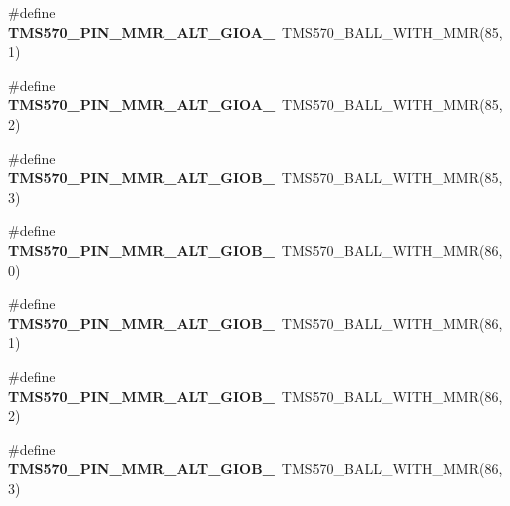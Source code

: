 \begin{DoxyCompactItemize}
\item 
\mbox{\label{tms570lc4357-pins_8h_ab5885cb13bfd1090faae8cbc427b3018}} 
\#define {\bfseries T\+M\+S570\+\_\+\+P\+I\+N\+\_\+\+M\+M\+R\+\_\+\+A\+L\+T\+\_\+\+G\+I\+O\+A\+\_}~T\+M\+S570\+\_\+\+B\+A\+L\+L\+\_\+\+W\+I\+T\+H\+\_\+\+M\+MR(85, 1)
\item 
\mbox{\label{tms570lc4357-pins_8h_a97676f009eaab31f20d536e79f113e09}} 
\#define {\bfseries T\+M\+S570\+\_\+\+P\+I\+N\+\_\+\+M\+M\+R\+\_\+\+A\+L\+T\+\_\+\+G\+I\+O\+A\+\_}~T\+M\+S570\+\_\+\+B\+A\+L\+L\+\_\+\+W\+I\+T\+H\+\_\+\+M\+MR(85, 2)
\item 
\mbox{\label{tms570lc4357-pins_8h_ab7b10a216d5ad71d419e45476c634d60}} 
\#define {\bfseries T\+M\+S570\+\_\+\+P\+I\+N\+\_\+\+M\+M\+R\+\_\+\+A\+L\+T\+\_\+\+G\+I\+O\+B\+\_}~T\+M\+S570\+\_\+\+B\+A\+L\+L\+\_\+\+W\+I\+T\+H\+\_\+\+M\+MR(85, 3)
\item 
\mbox{\label{tms570lc4357-pins_8h_a47709416080973f8d8bc85a51ff895ce}} 
\#define {\bfseries T\+M\+S570\+\_\+\+P\+I\+N\+\_\+\+M\+M\+R\+\_\+\+A\+L\+T\+\_\+\+G\+I\+O\+B\+\_}~T\+M\+S570\+\_\+\+B\+A\+L\+L\+\_\+\+W\+I\+T\+H\+\_\+\+M\+MR(86, 0)
\item 
\mbox{\label{tms570lc4357-pins_8h_aa33053861978142985b99da427b9e0f0}} 
\#define {\bfseries T\+M\+S570\+\_\+\+P\+I\+N\+\_\+\+M\+M\+R\+\_\+\+A\+L\+T\+\_\+\+G\+I\+O\+B\+\_}~T\+M\+S570\+\_\+\+B\+A\+L\+L\+\_\+\+W\+I\+T\+H\+\_\+\+M\+MR(86, 1)
\item 
\mbox{\label{tms570lc4357-pins_8h_af1492a86d078db77f89b7022be3dc39a}} 
\#define {\bfseries T\+M\+S570\+\_\+\+P\+I\+N\+\_\+\+M\+M\+R\+\_\+\+A\+L\+T\+\_\+\+G\+I\+O\+B\+\_}~T\+M\+S570\+\_\+\+B\+A\+L\+L\+\_\+\+W\+I\+T\+H\+\_\+\+M\+MR(86, 2)
\item 
\mbox{\label{tms570lc4357-pins_8h_a1f518a693681fbb363e574ef25ed6dd5}} 
\#define {\bfseries T\+M\+S570\+\_\+\+P\+I\+N\+\_\+\+M\+M\+R\+\_\+\+A\+L\+T\+\_\+\+G\+I\+O\+B\+\_}~T\+M\+S570\+\_\+\+B\+A\+L\+L\+\_\+\+W\+I\+T\+H\+\_\+\+M\+MR(86, 3)
\item 
\mbox{\label{tms570lc4357-pins_8h_ad313b8f726b0312656c1f8259c579daa}} 

\end{DoxyCompactItemize}
